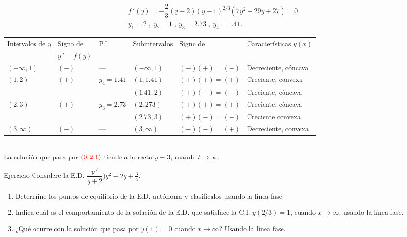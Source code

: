 \documentclass{beamer}
\begin{document}
\begin{frame}[t]
	\begin{exampleblock}{}
		\[
			\begin{array}{c}
				f\,' (y) = - \dfrac{2}{3} (y-2) (y-1) ^{2/3} (7y^2-29y+27) =0 \\[2mm]
				\tilde{y} _1=2 \;,\; \tilde{y} _2=1 \;,\; \tilde{y} _3 = 2.73 \;,\; \tilde{y} _4 = 1.41.
			\end{array}
		\]
		\tiny
		\begin{tabular}{*{6}{l}}
			\color{blue} Intervalos de \(y\) & \color{blue} Signo de & \color{blue} P.I. & \color{blue} Subintervalos & \color{blue} Signo de & \color{blue} Características \(y(x)\) \\
			& \color{blue} \(y\,' =f(y)\) &&&&\\
			\((- \infty ,1)\) & \((-)\)  & --- & \((- \infty ,1)\) & \((-) (+) =(-)\) & Decreciente, cóncava\\
			\((1,2)\) & \((+)\) & \(y_4=1.41\) & \((1,1.41)\) & \((+) (+) =(+)\) & Creciente, convexa\\
			&&& \((1.41,2)\) & \((+) (-) =(-)\) & Creciente, cóncava\\
			\((2,3)\) & \((+)\) & \(y_3=2.73\) & \((2,273)\) & \((+) (+) =(+)\) & Creciente, cóncava\\
			&&& \((2.73,3)\) & \((+) (-) =(-)\) & Creciente convexa\\
			\((3, \infty)\) & \((-)\) & --- & \((3, \infty)\) & \((-) (-) =(+)\) & Decreciente, convexa
		\end{tabular}\\[4mm]
		\normalsize
		La solución que pasa por \(\color{red} (0,2.1)\) tiende a la recta \(y=3\), cuando \(t \longrightarrow \infty\).
	\end{exampleblock}
\end{frame}

\begin{frame}[t]
	\begin{alertblock}{Ejercicio}
		Considere la E.D. \(\dfrac{y\,'}{y+2} ) y^2-2y+ \frac 34\).
		\begin{enumerate}
			\item Determine los puntos de equilibrio de la E.D. autónoma y clasifícalos usando la línea fase.
			\item Indica cuál es el comportamiento de la solución de la E.D. que satisface la C.I. \(y(2/3) =1\), cuando \(x \longrightarrow \infty\), usando la línea fase.
			\item ¿Qué ocurre con la solución que pasa por \(y(1) =0\) cuando \(x \longrightarrow \infty\)? Usando la línea fase.
		\end{enumerate}
	\end{alertblock}
\end{frame}

\end{document}

